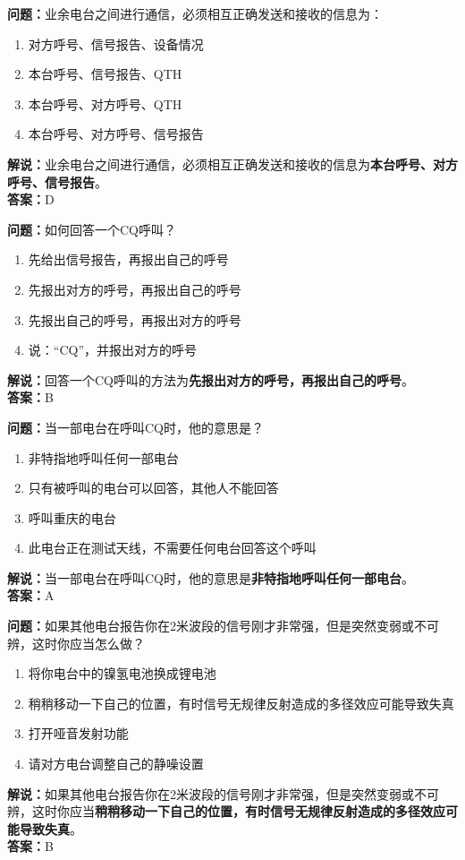 \documentclass{ctexbook}
\begin{document}
\bigskip


\noindent\textbf{问题：}业余电台之间进行通信，必须相互正确发送和接收的信息为：
\begin{enumerate}[label=\Alph*), leftmargin=3em]
	\item 对方呼号、信号报告、设备情况
	\item 本台呼号、信号报告、QTH
	\item 本台呼号、对方呼号、QTH
	\item 本台呼号、对方呼号、信号报告
\end{enumerate}
\noindent\textbf{解说：}业余电台之间进行通信，必须相互正确发送和接收的信息为\textbf{本台呼号、对方呼号、信号报告}。\\\noindent\textbf{答案：}D


\bigskip


\noindent\textbf{问题：}如何回答一个CQ呼叫？
\begin{enumerate}[label=\Alph*), leftmargin=3em]
	\item 先给出信号报告，再报出自己的呼号
	\item 先报出对方的呼号，再报出自己的呼号
	\item 先报出自己的呼号，再报出对方的呼号
	\item 说：“CQ”，并报出对方的呼号
\end{enumerate}
\noindent\textbf{解说：}回答一个CQ呼叫的方法为\textbf{先报出对方的呼号，再报出自己的呼号}。\\\noindent\textbf{答案：}B


\bigskip


\noindent\textbf{问题：}当一部电台在呼叫CQ时，他的意思是？
\begin{enumerate}[label=\Alph*), leftmargin=3em]
	\item 非特指地呼叫任何一部电台
	\item 只有被呼叫的电台可以回答，其他人不能回答
	\item 呼叫重庆的电台
	\item 此电台正在测试天线，不需要任何电台回答这个呼叫
\end{enumerate}
\noindent\textbf{解说：}当一部电台在呼叫CQ时，他的意思是\textbf{非特指地呼叫任何一部电台}。\\\noindent\textbf{答案：}A


\bigskip


\noindent\textbf{问题：}如果其他电台报告你在2米波段的信号刚才非常强，但是突然变弱或不可辨，这时你应当怎么做？
\begin{enumerate}[label=\Alph*), leftmargin=3em]
	\item 将你电台中的镍氢电池换成锂电池
	\item 稍稍移动一下自己的位置，有时信号无规律反射造成的多径效应可能导致失真
	\item 打开哑音发射功能
	\item 请对方电台调整自己的静噪设置
\end{enumerate}
\noindent\textbf{解说：}如果其他电台报告你在2米波段的信号刚才非常强，但是突然变弱或不可辨，这时你应当\textbf{稍稍移动一下自己的位置，有时信号无规律反射造成的多径效应可能导致失真}。\\\noindent\textbf{答案：}B
\end{document}
